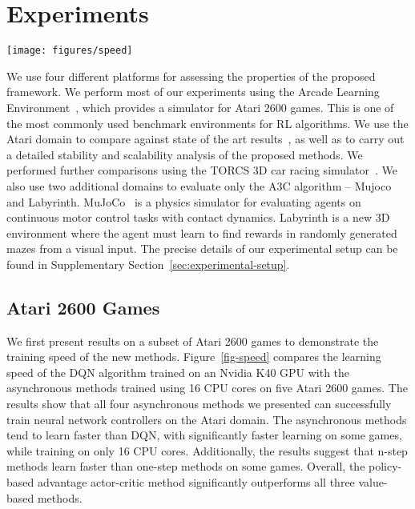 \documentclass{article} \usepackage{times}
\begin{document}
\section{Experiments}
\label{sec:experiments}
\begin{figure*}[t]
\begin{center}
\texttt{[image: figures/speed]}
\caption{\label{fig-speed} Learning speed comparison for DQN and the new asynchronous algorithms on five Atari 2600 games. DQN was trained on a single Nvidia K40 GPU while the asynchronous methods were trained using 16 CPU cores. The plots are averaged over 5 runs.  In the case of DQN the runs were for different seeds with fixed hyperparameters.  For asynchronous methods we average over the best 5 models from 50 experiments with learning rates sampled from  and all other hyperparameters fixed.}
\end{center}
\vspace{-0.45cm}
\end{figure*}

We use four different platforms for assessing the properties of the proposed framework.
We perform most of our experiments using the Arcade Learning Environment~\citep{bellemare-ale}, which provides a simulator for Atari 2600 games.
This is one of the most commonly used benchmark environments for RL algorithms.
We use the Atari domain to 
compare against state of the art results~\cite{hado2015doubledqn,wang2015dueling,schaul2015prioritized,nair2015gorila,mnih-dqn-2015},
as well as to carry out a detailed stability and scalability analysis of the proposed methods.
We performed further comparisons using the TORCS 3D car racing simulator~\citep{wymann-torcs}.
We also use two additional domains to evaluate only the A3C algorithm -- Mujoco and Labyrinth.  MuJoCo~\citep{todorov-mujoco} is a physics simulator for evaluating agents on continuous motor control tasks with contact dynamics.
Labyrinth is a new 3D environment where the agent must learn to find rewards in randomly generated mazes from a visual input.
The precise details of our experimental setup can be found in Supplementary Section~\ref{sec:experimental-setup}. 




\subsection{Atari 2600 Games}

We first present results on a subset of Atari 2600 games to demonstrate the training speed of the new methods.
Figure~\ref{fig-speed} compares the learning speed of the DQN algorithm trained on an Nvidia K40 GPU with the asynchronous methods trained using 16 CPU cores on five Atari 2600 games.
The results show that all four asynchronous methods we presented can successfully train neural network controllers on the Atari domain.
The asynchronous methods tend to learn faster than DQN, with significantly faster learning on some games, while training on only 16 CPU cores.
Additionally, the results suggest that n-step methods learn faster than one-step methods on some games.
Overall, the policy-based advantage actor-critic method significantly outperforms all three value-based methods.
\end{document}
